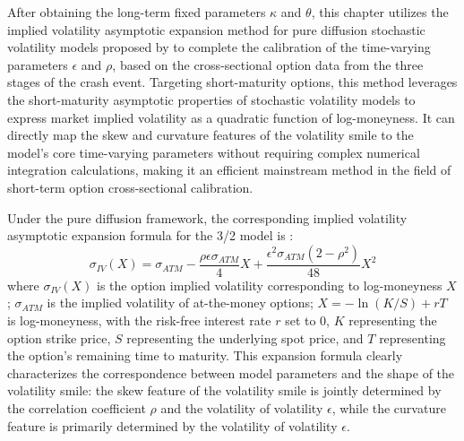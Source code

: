 After obtaining the long-term fixed parameters $\kappa$ and $\theta$, this chapter utilizes the implied volatility asymptotic expansion method for pure diffusion stochastic volatility models proposed by \citet{medvedevApproximationCalibrationShortTerm2007} to complete the calibration of the time-varying parameters $\epsilon$ and $\rho$, based on the cross-sectional option data from the three stages of the crash event. Targeting short-maturity options, this method leverages the short-maturity asymptotic properties of stochastic volatility models to express market implied volatility as a quadratic function of log-moneyness. It can directly map the skew and curvature features of the volatility smile to the model's core time-varying parameters without requiring complex numerical integration calculations, making it an efficient mainstream method in the field of short-term option cross-sectional calibration.

Under the pure diffusion framework, the corresponding implied volatility asymptotic expansion formula for the 3/2 model is \citet{medvedevApproximationCalibrationShortTerm2007}:
\[
\sigma_{IV}(X) = \sigma_{ATM} - \frac{\rho \epsilon \sigma_{ATM}}{4} X + \frac{\epsilon^2 \sigma_{ATM} (2-\rho^2)}{48} X^2
\]
where $\sigma_{IV}(X)$ is the option implied volatility corresponding to log-moneyness $X$; $\sigma_{ATM}$ is the implied volatility of at-the-money options; $X = -\ln(K/S) + rT$ is log-moneyness, with the risk-free interest rate $r$ set to 0, $K$ representing the option strike price, $S$ representing the underlying spot price, and $T$ representing the option's remaining time to maturity. This expansion formula clearly characterizes the correspondence between model parameters and the shape of the volatility smile: the skew feature of the volatility smile is jointly determined by the correlation coefficient $\rho$ and the volatility of volatility $\epsilon$, while the curvature feature is primarily determined by the volatility of volatility $\epsilon$.

